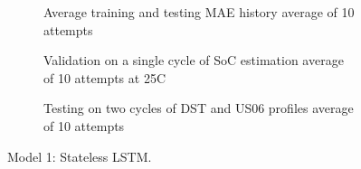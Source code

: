 \begin{figure*}[htbp]
\begin{subfigure}[b]{0.325\textwidth}
        \centering
        
        \caption{Average training and testing MAE history average of 10 attempts}
    \end{subfigure}
    \hfill
    \begin{subfigure}[b]{0.325\textwidth}
        \centering
        
        \caption{Validation on a single cycle of SoC estimation average of 10 attempts at 25\textdegree{}C}
    \end{subfigure}
    \hfill
    \begin{subfigure}[b]{0.325\textwidth}
        \centering
        
        \caption{Testing on two cycles of DST and US06 profiles average of 10 attempts}
    \end{subfigure}
    \caption{Model 1: Stateless LSTM.}
    \label{fig:Model-1res}
\end{figure*}
\clearpage
